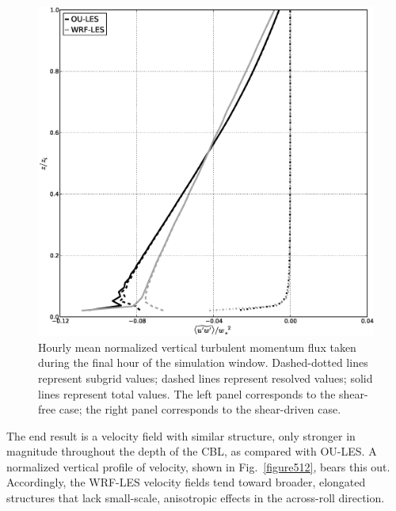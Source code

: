 \begin{figure}[!ht]
\begin{center}
\includegraphics[width=\textwidth]{figures/chapter5/stress13}
\end{center}
\caption{Hourly mean normalized vertical turbulent momentum flux taken during the final hour of the simulation window. Dashed-dotted lines represent subgrid values; dashed lines represent resolved values; solid lines represent total values. The left panel corresponds to the shear-free case; the right panel corresponds to the shear-driven case.}
\label{figure511}
\end{figure}


The end result is a velocity field with similar structure, only stronger in magnitude throughout the depth of the CBL, as compared with OU-LES. A normalized vertical profile of velocity, shown in Fig.~\ref{figure512}, bears this out. Accordingly, the WRF-LES velocity fields tend toward broader, elongated structures that lack small-scale, anisotropic effects in the across-roll direction.


